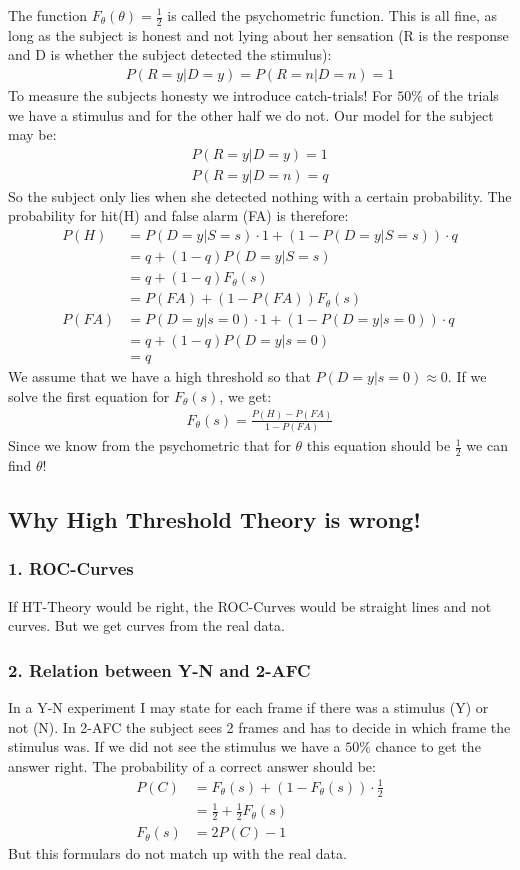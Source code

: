 \documentclass[../main/Notes.tex]{subfiles}
\begin{document}
\bigskip
The function $F_\theta(\theta)=\frac{1}{2}$ is called the psychometric function. This is all fine, as long as the subject is honest and not lying about her sensation (R is the response and D is whether the subject detected the stimulus):
\begin{align*}
P(R=y|D=y)=P(R=n|D=n)=1
\end{align*}
To measure the subjects honesty we introduce catch-trials! For $50\%$ of the trials we have a stimulus and for the other half we do not. Our model for the subject may be:
\begin{align*}
P(R=y|D=y)=1\\
P(R=y|D=n)=q
\end{align*}
So the subject only lies when she detected nothing with a certain probability. The probability for hit(H) and false alarm (FA) is therefore:
\begin{align*}
P(H)&=P(D=y|S=s)\cdot 1+(1-P(D=y|S=s))\cdot q\\
    &=q+(1-q)P(D=y|S=s)\\
    &=q+(1-q)F_\theta(s)\\
    &=P(FA)+(1-P(FA))F_\theta(s)\\
P(FA)&=P(D=y|s=0)\cdot 1 + (1-P(D=y|s=0))\cdot q\\
     &=q+(1-q)P(D=y|s=0)\\
     &=q
\end{align*}
We assume that we have a high threshold so that $P(D=y|s=0)\approx 0$. If we solve the first equation for $F_\theta(s)$, we get:
\begin{align*}
F_\theta(s)=\frac{P(H)-P(FA)}{1-P(FA)}
\end{align*}
Since we know from the psychometric that for $\theta$ this equation should be $\frac{1}{2}$ we can find $\theta$!

\subsection{Why High Threshold Theory is wrong!}
\subsubsection*{1. ROC-Curves}
If HT-Theory would be right, the ROC-Curves would be straight lines and not curves. But we get curves from the real data.
\subsubsection*{2. Relation between Y-N and 2-AFC}
\label{subsubsec:RelYN2AFC}
In a Y-N experiment I may state for each frame if there was a stimulus (Y) or not (N). In 2-AFC the subject sees 2 frames and has to decide in which frame the stimulus was. If we did not see the stimulus we have a $50\%$ chance to get the answer right. The probability of a correct answer should be:
\begin{align*}
P(C) &=F_\theta(s)+(1-F_\theta(s))\cdot\frac{1}{2}\\
     &=\frac{1}{2} + \frac{1}{2}F_\theta(s)\\
F_\theta(s)&=2P(C)-1    
\end{align*}
But this formulars do not match up with the real data.
\end{document}
